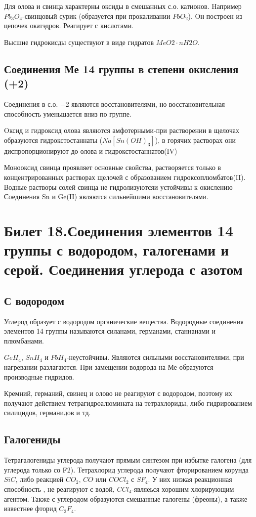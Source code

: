 \documentclass[11pt]{article}
\begin{document}
Для олова и свинца характерны оксиды в смешанных с.о. катионов. Hапример
$Pb_3O_4$-свинцовый сурик (образуется при прокаливании $PbO_2$). Oн построен из цепочек
окатэдров. Реагирует с кислотами.

Высшие гидрокисды существуют в виде гидратов $MeO2\cdot nH2O$.

\subsection{Соединения Ме 14 группы в степени окисления (+2)}
Соединения в с.о. +2 являются восстановителями, но восстановительная способность
уменьшается вниз по группе.

Oксид и гидроксид олова являются амфотерными-при растворении в щелочах
образуются гидрокстостаннаты ($Na[Sn(OH)_3]$), в горячих растворах они
диспропорционируют до олова и гидрокстостаннатов(IV)

Монооксид свинца проявляет основные свойства, растворяется только в
концентрированных растворах щелочей с образованием гидроксоплюмбатов(II). Водные
растворы солей свинца не гидролизуютсяи устойчивы к окислению
Соединения Sn и Ge(II) являются сильнейшими восстановителями.


\section{Билет 18.Соединения элементов 14 группы с водородом, галогенами и серой. Соединения
углерода с азотом}
\subsection{С водородом}
Углерод образует с водородом органические вещества. Водородные соединения
элементов 14 группы называются силанами, германами, станнанами и плюмбанами.

$GeH_4$, $SnH_4$ и $PbH_4$-неустойчивы. Являются сильными восстановителями, при нагревании
разлагаются. При замещении водорода на Ме образуются производные гидридов.

Кремний, германий, свинец и олово не реагируют с водородом, поэтому их
получают действием тетрагидроалюмината на тетрахлориды, либо гидрированием
силицидов, германидов и тд.

\subsection{Галогениды}
 Тетрагалогениды углерода получают прямым синтезом при избытке
галогена (для углерода только со F2). Тетрахлорид углерода получают фторированием
корунда $SiC$, либо реакцией $CO_2$, $CO$ или $COCl_2$ с $SF_4$. У них низкая реакционная
способность , не реагируют с водой, $CCl_4$-являеься хорошим хлорирующим агентом.
Также с углеродом образуются смешанные галогены (фреоны), а также известнее фторид $C_2F_4$.
\end{document}
